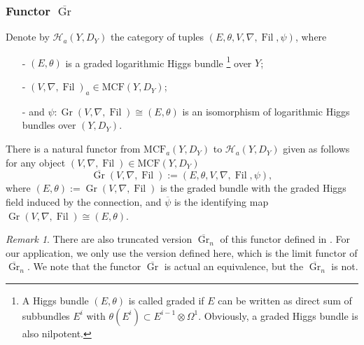 \documentclass[12pt,twoside]{book}
\theoremstyle{plain}
\theoremstyle{definition}
\theoremstyle{remark}
\newtheorem{remark}[remark]{Remark}
\DeclareMathOperator\Fil{Fil}
\DeclareMathOperator\Gr{Gr}
\newcommand{\MCF}{\mathrm{MCF}}
\numberwithin{equation}{section}
\begin{document}
\subsubsection{Functor $\overline{\Gr}$}
Denote by $\mathcal{H}_a(Y,D_Y)$ the category of tuples $(E,\theta,V,\nabla,\Fil,\psi)$, where
\begin{itemize}
\item[-] $(E,\theta)$ is a graded logarithmic Higgs bundle
\footnote{A Higgs bundle $(E,\theta)$ is called graded if $E$ can be written as direct sum of subbundles $E^{i}$ with $\theta(E^i)\subset E^{i-1}\otimes\Omega^1$. Obviously, a graded Higgs bundle is also nilpotent.}
over $Y$;
\item[-] $(V,\nabla,\Fil)_a\in \MCF(Y,D_Y)$;
\item[-] and $\psi: \Gr(V,\nabla,\Fil) \cong (E,\theta)$ is an isomorphism of logarithmic Higgs bundles over $(Y,D_Y)$.
\end{itemize}
There is a natural functor from $\MCF_a(Y,D_Y)$ to $\mathcal{H}_a(Y,D_Y)$ given as follows for any object $(V,\nabla,\Fil)\in \MCF(Y,D_Y)$
\[\overline{\Gr}(V,\nabla,\Fil):=(E,\theta,V,\nabla,\Fil,\psi),\]
where $(E,\theta):=\Gr(V,\nabla,\Fil)$ is the graded bundle with the graded Higgs field induced by the connection, and $\overline{\psi}$ is the identifying map $\Gr(V,\nabla,\Fil)\cong (E,\theta)$.
\begin{remark} There are also truncated version $\overline{\Gr}_n$ of this functor defined in \cite{LSZ19,SYZ22}. For our application, we only use the version defined here, which is the limit functor of $\overline{\Gr}_n$. We note that the functor $\overline{\Gr}$ is actual an equivalence, but the $\overline{\Gr}_n$ is not.
\end{remark}
\end{document}
